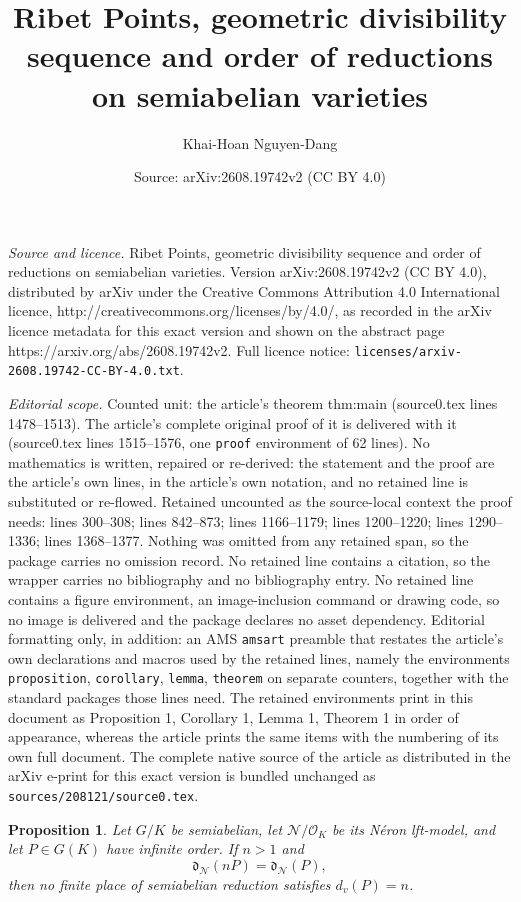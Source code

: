\documentclass[10pt,a4paper]{amsart}
\title{Ribet Points, geometric divisibility sequence and order of reductions on semiabelian varieties}
\author{Khai-Hoan Nguyen-Dang}
\date{Source: arXiv:2608.19742v2 (CC BY 4.0)}
\newtheorem{proposition}{Proposition}
\newcommand{\Ner}{\mathcal N}
\newcommand{\OK}{\mathcal O_K}
\begin{document}
\maketitle

\noindent\emph{Source and licence.} Ribet Points, geometric divisibility sequence and order of reductions on semiabelian varieties. Version arXiv:2608.19742v2 (CC BY 4.0), distributed by arXiv under the Creative Commons Attribution 4.0 International licence, http://creativecommons.org/licenses/by/4.0/, as recorded in the arXiv licence metadata for this exact version and shown on the abstract page https://arxiv.org/abs/2608.19742v2. Full licence notice: \texttt{licenses/arxiv-2608.19742-CC-BY-4.0.txt}.\par\smallskip

\noindent\textit{Editorial scope.} Counted unit: the article's theorem thm:main (source0.tex lines 1478--1513). The article's complete original proof of it is delivered with it (source0.tex lines 1515--1576, one \texttt{proof} environment of 62 lines). No mathematics is written, repaired or re-derived: the statement and the proof are the article's own lines, in the article's own notation, and no retained line is substituted or re-flowed.  Retained uncounted as the source-local context the proof needs: lines 300--308; lines 842--873; lines 1166--1179; lines 1200--1220; lines 1290--1336; lines 1368--1377.  Nothing was omitted from any retained span, so the package carries no omission record.  No retained line contains a citation, so the wrapper carries no bibliography and no bibliography entry.  No retained line contains a figure environment, an image-inclusion command or drawing code, so no image is delivered and the package declares no asset dependency.  Editorial formatting only, in addition: an AMS \texttt{amsart} preamble that restates the article's own declarations and macros used by the retained lines, namely the environments \texttt{proposition}, \texttt{corollary}, \texttt{lemma}, \texttt{theorem} on separate counters, together with the standard packages those lines need.  The retained environments print in this document as Proposition 1, Corollary 1, Lemma 1, Theorem 1 in order of appearance, whereas the article prints the same items with the numbering of its own full document.  The complete native source of the article as distributed in the arXiv e-print for this exact version is bundled unchanged as \texttt{sources/208121/source0.tex}.
\begin{proposition}
\label{prop:intro-return-excludes-order}
Let $G/K$ be semiabelian, let $\Ner/\OK$ be its N\'eron lft-model, and let
$P\in G(K)$ have infinite order.  If $n>1$ and
\[
 \mathfrak d_{\Ner}(nP)=\mathfrak d_{\Ner}(P),
\]
then no finite place of semiabelian reduction satisfies $d_v(P)=n$.
\end{proposition}
\end{document}
